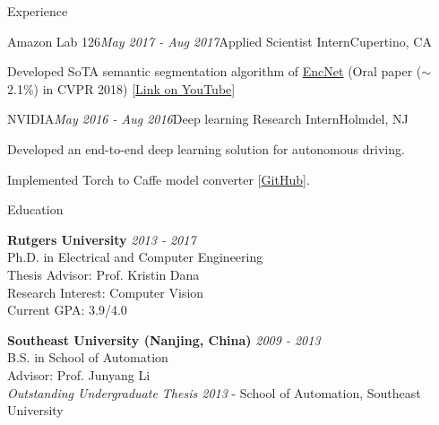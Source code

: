 \documentclass{resume} %
\begin{document}
\begin{rSection}{Experience}

\begin{rSubsection}{Amazon Lab 126}{\em May 2017 - Aug 2017}{Applied Scientist Intern}{Cupertino, CA}
\item Developed SoTA semantic segmentation algorithm of \href{https://scholar.google.com/citations?view_op=view_citation&hl=en&user=gCoWdkUAAAAJ&sortby=pubdate&citation_for_view=gCoWdkUAAAAJ:9Nmd_mFXekcC}{EncNet} (Oral paper ($\sim$2.1\%) in CVPR 2018) [\href{https://www.youtube.com/watch?v=vAhzirU4WqA}{Link on YouTube}]
\end{rSubsection}

\begin{rSubsection}{NVIDIA}{\em May 2016 - Aug 2016}{Deep learning Research Intern}{Holmdel, NJ}
\item Developed an end-to-end deep learning solution for autonomous driving. 
\item Implemented Torch to Caffe model converter [\href{https://github.com/zhanghang1989/fb-caffe-exts}{GitHub}].
\end{rSubsection}

\end{rSection}

\begin{rSection}{Education}

{\bf Rutgers University} \hfill {\em 2013 - 2017} \\
Ph.D. in Electrical and Computer Engineering \\
Thesis Advisor: Prof. Kristin Dana \\
Research Interest: Computer Vision\\
Current GPA: 3.9/4.0

{\bf Southeast University (Nanjing, China)} \hfill {\em 2009 - 2013} \\
B.S. in School of Automation \\
Advisor: Prof. Junyang Li \\
 {\it Outstanding Undergraduate Thesis 2013} - School of Automation, Southeast University%
\end{rSection}
\end{document}
